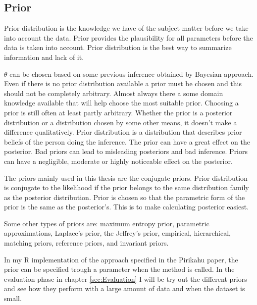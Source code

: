 \subsection{Prior}\label{Prior}
Prior distribution is the knowledge we have of the subject matter before we take into account the data.\cite{Box1973BayesianII} Prior provides the plausibility for all parameters before the data is taken into account. \cite{Mcelreath2015StatisticalRA}\cite{Robert2007TheBC} Prior distribution is the best way to summarize information and lack of it.\cite{Robert2007TheBC} 

$\theta$ can be chosen based on some previous inference obtained by Bayesian approach. Even if there is no prior distribution available a prior must be chosen and this should not be completely arbitrary. Almost always there a some domain knowledge available that will help choose the most suitable prior.\cite{Mcelreath2015StatisticalRA} Choosing a prior is still often at least partly arbitrary.\cite{Robert2007TheBC} Whether the prior is a posterior distribution or a distribution chosen by some other means, it doesn't make a difference qualitatively. Prior distribution is a distribution that describes prior beliefs of the person doing the inference.\cite{Lindley1990The1W} The prior can have a great effect on the posterior. Bad priors can lead to misleading posteriors and bad inference.\cite{Mcelreath2015StatisticalRA} Priors can have a negligible, moderate or highly noticeable effect on the posterior.\cite{Robert2007TheBC}

The priors mainly used in this thesis are the conjugate priors. Prior distribution is conjugate to the likelihood if the prior belongs to the same distribution family as the posterior distribution. Prior is chosen so that the parametric form of the prior is the same as the posterior's. This is to make calculating posterior easiest. \cite{SUGIYAMA2016185}

Some other types of priors are: maximum entropy prior, parametric approximations, Laplace’s prior, the Jeffrey's prior, empirical, hierarchical, matching priors, reference priors, and invariant priors. \cite{Robert2007TheBC}

In my R implementation of the approach specified in the Pirikahu paper, the prior can be specified trough a parameter when the method is called. In the evaluation phase in chapter \ref{sec:Evaluation} I will be try out the different priors and see how they perform with a large amount of data and when the dataset is small.

